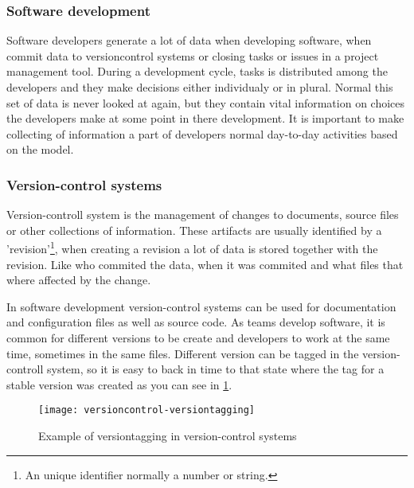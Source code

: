 \subsubsection{Software development}
Software developers generate a lot of data when developing software, when commit data to versioncontrol systems or closing tasks or issues in a project management tool. During a development cycle, tasks is distributed among the developers and they make decisions either individualy or in plural. Normal this set of data is never looked at again, but they contain vital information on choices the developers make at some point in there development. It is important to make collecting of information a part of developers normal day-to-day activities based on the model\cite{Krogstie2009}.

\subsubsection{Version-control systems}
Version-controll system is the management of changes to documents, source files or other collections of information. These artifacts are usually identified by a 'revision'\footnote{An unique identifier normally a number or string.}, when creating a revision a lot of data is stored together with the revision. Like who commited the data, when it was commited and what files that where affected by the change.

In software development version-control systems can be used for documentation and configuration files as well as source code. As teams develop software, it is common for different versions to be create and developers to work at the same time, sometimes in the same files. Different version can be tagged in the version-controll system, so it is easy to back in time to that state where the tag for a stable version was created as you can see in \ref{versiontagging}.

\begin{figure}[!htpb]
\centering
	\texttt{[image: versioncontrol-versiontagging]}
\caption{Example of versiontagging in version-control systems}
\label{versiontagging}
\end{figure}





